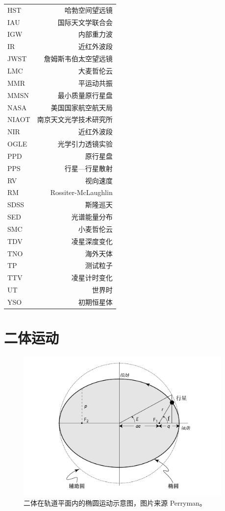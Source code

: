 \begin{multicols}{2}
\begin{tabularx}{0.85\linewidth}{@{\extracolsep{\fill}}lr}
\centering
HST			&   哈勃空间望远镜			\\
IAU			&   国际天文学联合会		\\
IGW			&   内部重力波				\\
IR			&   近红外波段				\\
JWST		&   詹姆斯韦伯太空望远镜		\\
LMC			&   大麦哲伦云				\\
MMR		&   平运动共振				\\   
MMSN		&   最小质量原行星盘		\\
NASA		&   美国国家航空航天局		\\
NIAOT		&   南京天文光学技术研究所	\\
NIR			&   近红外波段				\\
OGLE		&   光学引力透镜实验		\\
PPD			&   原行星盘				\\
PPS			&   行星---行星散射			\\
RV			&   视向速度				\\
RM 			&   Rossiter-McLaughlin 		\\
SDSS		&   斯隆巡天				\\
SED			&   光谱能量分布			\\
SMC			&   小麦哲伦云				\\
TDV			&   凌星深度变化			\\
TNO			&   海外天体				\\
TP			&   测试粒子				\\
TTV			&   凌星计时变化			\\
UT			&   世界时					\\
YSO			&   初期恒星体				
\end{tabularx}
\end{multicols}


\chapter{二体运动} \label{apdx:twobodyproblem}

\begin{figure}[h]
\centering
\includegraphics[width=0.95\textwidth]{figures/appendix/f1_ellipse.pdf}
\caption{二体在轨道平面内的椭圆运动示意图，图片来源 Perryman。}
\label{fig:ellipse}
\end{figure}

